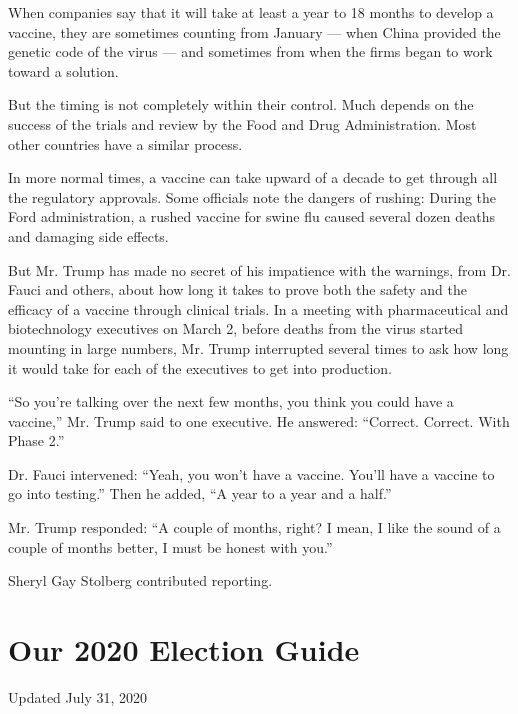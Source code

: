 When companies say that it will take at least a year to 18 months to
develop a vaccine, they are sometimes counting from January --- when
China provided the genetic code of the virus --- and sometimes from when
the firms began to work toward a solution.

But the timing is not completely within their control. Much depends on
the success of the trials and review by the Food and Drug
Administration. Most other countries have a similar process.

In more normal times, a vaccine can take upward of a decade to get
through all the regulatory approvals. Some officials note the dangers of
rushing: During the Ford administration, a rushed vaccine for swine flu
caused several dozen deaths and damaging side effects.

But Mr. Trump has made no secret of his impatience with the warnings,
from Dr. Fauci and others, about how long it takes to prove both the
safety and the efficacy of a vaccine through clinical trials. In a
meeting with pharmaceutical and biotechnology executives on March 2,
before deaths from the virus started mounting in large numbers, Mr.
Trump interrupted several times to ask how long it would take for each
of the executives to get into production.

``So you're talking over the next few months, you think you could have a
vaccine,'' Mr. Trump said to one executive. He answered: ``Correct.
Correct. With Phase 2.''

Dr. Fauci intervened: ``Yeah, you won't have a vaccine. You'll have a
vaccine to go into testing.'' Then he added, ``A year to a year and a
half.''

Mr. Trump responded: ``A couple of months, right? I mean, I like the
sound of a couple of months better, I must be honest with you.''

Sheryl Gay Stolberg contributed reporting.

\hypertarget{our-2020-election-guide}{%
\section{Our 2020 Election Guide}\label{our-2020-election-guide}}

Updated July 31, 2020

